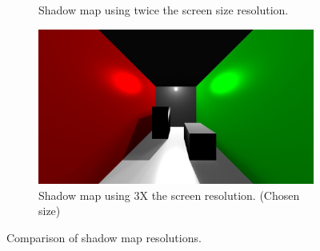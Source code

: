 \begin{figure}
\begin{subfigure}[b]{1.0\textwidth}
        		\caption{Shadow map using twice the screen size resolution.}
        \end{subfigure}
        \centering
        \begin{subfigure}[b]{1.0\textwidth}
        		\includegraphics[width=\textwidth]{AltResults/3SM.jpg}
        		\caption{Shadow map using 3X the screen resolution. (Chosen size)}
        \end{subfigure}
        \caption{Comparison of shadow map resolutions.}\label{fig:SMsizes}
\end{figure}

